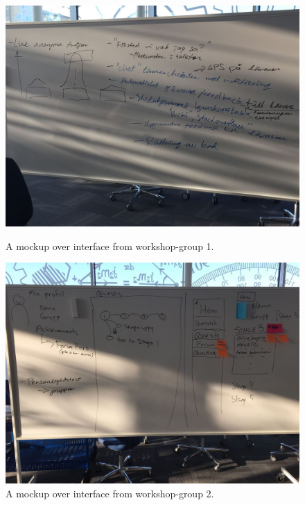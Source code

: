 \begin{figure}[H]
  \centering
  \begin{minipage}[b]{0.7\textwidth}
    \includegraphics[width=\textwidth]{img/Grupp1_Workshop_mockup.jpg}
    \caption{A mockup over interface from workshop-group 1.}
  \end{minipage}
  \hfill
  \begin{minipage}[b]{0.7\textwidth}
      \includegraphics[width=\textwidth]{img/Grupp2_Workshop_mockup.jpg}
    \caption{A mockup over interface from workshop-group 2.}
  \end{minipage}
\end{figure}
